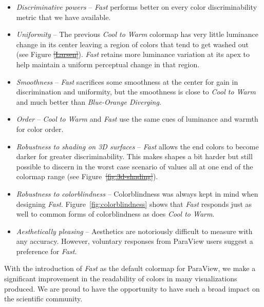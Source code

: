 \documentclass{IEEEcsmag}
\newcommand*{\colormap}[1]{\textsl{#1}\xspace}
\newcommand*{\coolwarm}{\colormap{Cool to Warm}}
\newcommand*{\blueorange}{\colormap{Blue-Orange Diverging}}
\newcommand*{\fast}{\colormap{Fast}}
\providecommand{\DIFaddtex}[1]{{\protect\color{blue}\uwave{#1}}} %
\providecommand{\DIFdeltex}[1]{{\protect\color{red}\sout{#1}}}                      %
\providecommand{\DIFaddbegin}{} %
\providecommand{\DIFaddend}{} %
\providecommand{\DIFdelbegin}{} %
\providecommand{\DIFdelend}{} %
\providecommand{\DIFadd}[1]{\texorpdfstring{\DIFaddtex{#1}}{#1}} %
\providecommand{\DIFdel}[1]{\texorpdfstring{\DIFdeltex{#1}}{}} %
\begin{document}
\begin{itemize}

\item \emph{Discriminative powers} --
  \fast performs better on every color discriminability metric that we have available.
\item \emph{Uniformity} --
  The previous \coolwarm colormap has very little luminance change in its center leaving a region of colors that tend to get washed out (see Figure \DIFdelbegin \DIFdel{\ref{Larsen}}\DIFdelend \DIFaddbegin \DIFadd{\ref{Larsen3}}\DIFaddend ).
  \fast retains more luminance variation at its apex to help maintain a uniform perceptual change in that region.
\item \emph{Smoothness} --
  \fast sacrifices some smoothness at the center for gain in discrimination and uniformity, but the smoothness is close to \coolwarm and much better than \blueorange.
\item \emph{Order} --
  \coolwarm and \fast use the same cues of luminance and warmth for color order.
\item \emph{Robustness to shading on 3D surfaces} --
  \fast allows the end colors to become darker for greater discriminability.
  This makes shapes a bit harder but still possible to discern in the worst case scenario of values all at one end of the colormap range (see Figure~\DIFdelbegin \DIFdel{\ref{fig:3d-shading}}\DIFdelend \DIFaddbegin \DIFadd{\ref{Matrix}, right column}\DIFaddend ).
\item \emph{Robustness to colorblindness} --
  Colorblindness was always kept in mind when designing \fast.
  Figure~\ref{fig:colorblindness} shows that \fast responds just as well to common forms of colorblindness as does \coolwarm.
\item \emph{Aesthetically pleasing} --
  Aesthetics are notoriously difficult to measure with any accuracy.
  However, voluntary responses from ParaView users suggest a preference for \fast.

\end{itemize}



With the introduction of \fast as the default colormap for ParaView, we make a significant improvement in the readability of colors in many visualizations produced. We are proud to have the opportunity to have such a broad impact on the scientific community.
\end{document}

